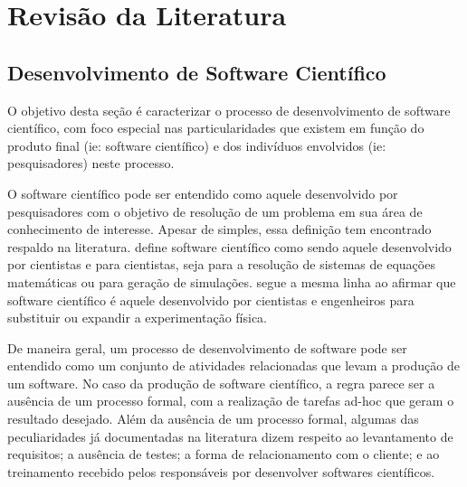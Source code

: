 \documentclass[
	article,			%
	11pt,				%
	oneside,			%
	a4paper,			%
	english,			%
	brazil,				%
	sumario=tradicional
	]{abntex2}
\begin{document}
\section*{Revisão da Literatura}

\subsection*{Desenvolvimento de Software Científico}
O objetivo desta seção é caracterizar o processo de desenvolvimento de software científico, com foco especial nas particularidades que existem em função do produto final (ie: software científico) e dos indivíduos envolvidos (ie: pesquisadores) neste processo.

O software científico pode ser entendido como aquele desenvolvido por pesquisadores com o objetivo de resolução de um problema em sua área de conhecimento de interesse. Apesar de simples, essa definição tem encontrado respaldo na literatura.  define software científico como sendo aquele desenvolvido por cientistas e para cientistas, seja para a resolução de sistemas de equações matemáticas ou para geração de simulações.  segue a mesma linha ao afirmar que software científico é aquele desenvolvido por cientistas e engenheiros para substituir ou expandir a experimentação física.

De maneira geral, um processo de desenvolvimento de software pode ser entendido como um conjunto de atividades relacionadas que levam a produção de um software. No caso da produção de software científico, a regra parece ser a ausência de um processo formal, com a realização de tarefas ad-hoc que geram o resultado desejado. Além da ausência de um processo formal, algumas das peculiaridades já documentadas na literatura dizem respeito ao levantamento de requisitos; a ausência de testes; a forma de relacionamento com o cliente; e ao treinamento recebido pelos responsáveis por desenvolver softwares científicos.
\end{document}
